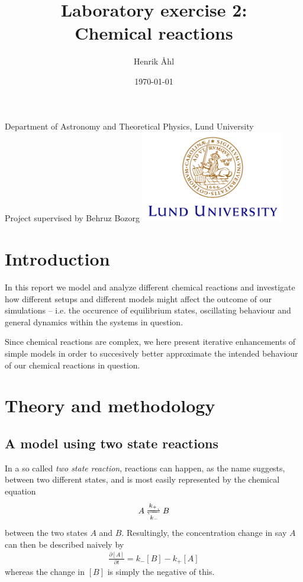 \documentclass[a4paper,12pt]{article}
\title
{
	\textbf
	{
      Laboratory exercise 2: \\Chemical reactions
   }
}
\author{Henrik Åhl}
\date{\today}
\theoremstyle{plain}
\theoremstyle{definition}
\begin{document}
\begin{titlepage}
	
   \maketitle 
	\begin{center}
		\phantom{a}
		{Department of Astronomy and Theoretical Physics, Lund University}
		\\[2cm]
		{Project supervised by Behruz Bozorg}
		\vfill
		\includegraphics[height=4cm]{logocLUeng.pdf}
	\end{center}
	\thispagestyle{empty} %

\end{titlepage}

\section{Introduction}
   In this report we model and analyze different chemical reactions and
   investigate how different setups and different models might affect the
   outcome of our simulations -- i.e. the occurence of equilibrium states,
   oscillating behaviour and general dynamics within the systems in question.

   Since chemical reactions are complex, we here present iterative enhancements 
   of simple models in order to succesively better approximate the intended 
   behaviour of our chemical reactions in question. 

\section{Theory and methodology}
	\setcounter{equation}{0}
   \subsection{A model using two state reactions}
      In a so called \emph{two state reaction}, reactions can happen, as the name
      suggests, between two different states, and is most easily represented by the
      chemical equation 
         \begin{align}
            A \xrightleftharpoons[k_-]{k_+} B
         \end{align}
      between the two states $A$ and $B$. Resultingly, the concentration change in
      say $A$ can then be described naively by
      \begin{align}
         \frac{\partial [A]}{\partial t} = k_- [B] - k_+ [A]
         \label{eq:change_A}
      \end{align}
      whereas the change in $[B]$ is simply the negative of this. 
\end{document}
